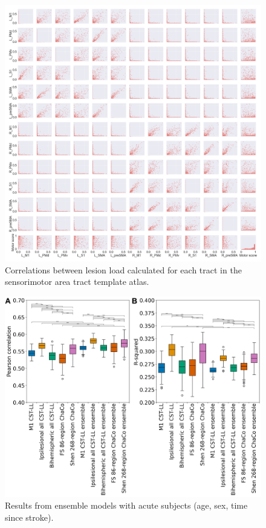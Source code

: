 \documentclass[10pt]{article}
\begin{document}
\begin{figure}[ht]
\centering
\includegraphics[width=1\linewidth]{figures/SMATT_bi_scatterplts.png}
\caption{Correlations between lesion load calculated for each tract in the sensorimotor area tract template atlas.}
\label{smatt_pairwise_correlations_bi}
\end{figure}




\begin{figure}[ht]
\centering
\includegraphics[width=1\linewidth]{figures/Analysis7.png}
\caption{Results from ensemble models with acute subjects (age, sex, time since stroke).}
\label{ensemble}
\end{figure}
\end{document}
